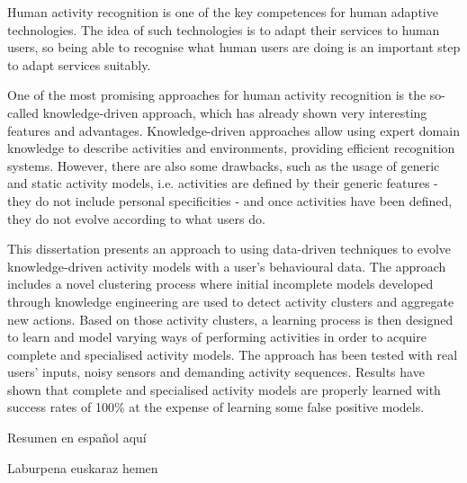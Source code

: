 




\begin{abstracts}        %

Human activity recognition is one of the key competences for human adaptive technologies. The idea of such technologies is to adapt their services to human users, so being able to recognise what human users are doing is an important step to adapt services suitably. 

One of the most promising approaches for human activity recognition is the so-called knowledge-driven approach, which has already shown very interesting features and advantages. Knowledge-driven approaches allow using expert domain knowledge to describe activities and environments, providing efficient recognition systems. However, there are also some drawbacks, such as the usage of generic and static activity models, i.e. activities are defined by their generic features - they do not include personal specificities - and once activities have been defined, they do not evolve according to what users do.

This dissertation presents an approach to using data-driven techniques to evolve knowledge-driven activity models with a user's behavioural data. The approach includes a novel clustering process where initial incomplete models developed through knowledge engineering are used to detect activity clusters and aggregate new actions. Based on those activity clusters, a learning process is then designed to learn and model varying ways of performing activities in order to acquire complete and specialised activity models. The approach has been tested with real users' inputs, noisy sensors and demanding activity sequences. Results have shown that complete and specialised activity models are properly learned with success rates of 100\% at the expense of learning some false positive models.

\end{abstracts}

\begin{resumen}        %

Resumen en espa\~nol aqu\'i


\end{resumen}

\begin{laburpena}        %
 
 Laburpena euskaraz hemen
 
\end{laburpena}





